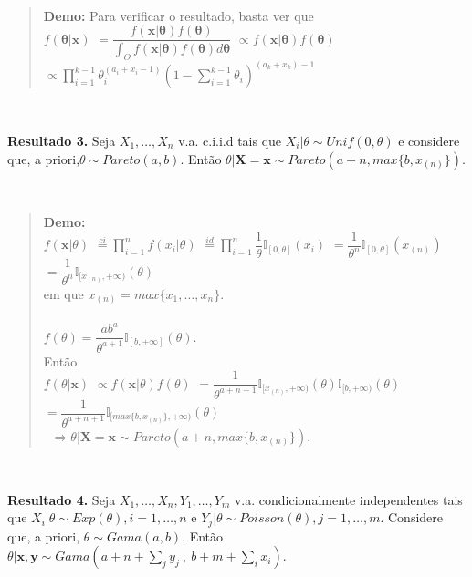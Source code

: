\documentclass[
]{book}
\begin{document}
\(~\)

\begin{quote}
\textbf{Demo:} Para verificar o resultado, basta ver que\\
\(f(\boldsymbol\theta|\boldsymbol x)\) \(=\dfrac{f(\boldsymbol x| \boldsymbol \theta)f(\boldsymbol \theta)}{\int_\Theta f(\boldsymbol x| \boldsymbol \theta)f(\boldsymbol \theta)d\boldsymbol \theta}\) \(\propto f(\boldsymbol x| \boldsymbol \theta)f(\boldsymbol \theta)\) \(\propto \prod_{i=1}^{k-1}\theta_i^{(a_i+x_i-1)}\left(1-\sum_{i=1}^{k-1}\theta_i\right)^{(a_k+x_k)-1}\)
\end{quote}

\(~\)

\textbf{Resultado 3.} Seja \(X_1,\ldots,X_n\) v.a. c.i.i.d tais que \(X_i|\theta \sim Unif(0,\theta)\) e considere que, a priori,\(\theta \sim Pareto(a,b)\). Então \(\theta|\boldsymbol X = \boldsymbol x \sim Pareto\left(a+n,max\{b,x_{(n)}\}\right)\).

\(~\)

\begin{quote}
\textbf{Demo:}\\
\(f(\boldsymbol x|\theta)\) \(\overset{ci}{=}\prod_{i=1}^nf(x_i|\theta)\) \(\overset{id}{=}\prod_{i=1}^n\dfrac{1}{\theta}\mathbb{I}_{[0,\theta]}(x_i)\) \(=\dfrac{1}{\theta^n}\mathbb{I}_{[0,\theta]}(x_{(n)})\) \(=\dfrac{1}{\theta^n}\mathbb{I}_{[x_{(n)},+\infty)}(\theta)\)\\
em que \(x_{(n)}=max\{x_1,\ldots,x_n\}\).\\
\(~\)\\
\(f(\theta)=\dfrac{ab^a}{\theta^{a+1}}\mathbb{I}_{[b,+\infty]}(\theta)\).\\
Então\\
\(f(\theta| \boldsymbol x)\) \(\propto f(\boldsymbol x|\theta)f(\theta)\) \(=\dfrac{1}{\theta^{a+n+1}}\mathbb{I}_{[x_{(n)},+\infty)}(\theta)\mathbb{I}_{[b,+\infty)}(\theta)\) \(=\dfrac{1}{\theta^{a+n+1}}\mathbb{I}_{[max\{b,x_{(n)}\},+\infty)}(\theta)\)\\
\(~\)
\(\Rightarrow \theta|\boldsymbol X = \boldsymbol x \sim Pareto(a+n,max\{b,x_{(n)}\})\).
\end{quote}

\(~\)

\textbf{Resultado 4.} Seja \(X_1,\ldots,X_n,Y_1,\ldots,Y_m\) v.a. condicionalmente independentes tais que \(X_i|\theta\sim Exp(\theta),i=1,\ldots,n\) e \(Y_j|\theta \sim Poisson(\theta),j=1,\ldots,m\). Considere que, a priori, \(\theta \sim Gama(a,b)\). Então \(\theta| \boldsymbol x,\boldsymbol y \sim Gama(a+n+\sum_jy_j~,~b+m+\sum_ix_i)\).
\end{document}
